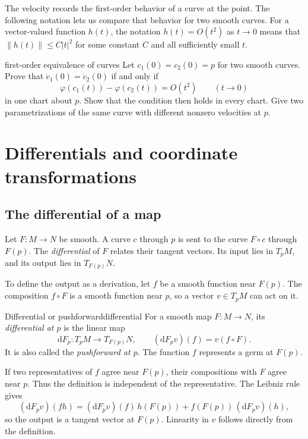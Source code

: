 \documentclass[11pt,a4paper]{article}
\numberwithin{equation}{section}
\newcommand{\dd}{\mathrm d}
\newcommand{\slidesref}[1]{\par\nobreak\smallskip\nobreak{\footnotesize\color{ink!60}\textsc{Source slides #1}}\par\nobreak\smallskip\nobreak}
\begin{document}
The velocity records the first-order behavior of a curve at the point.
The following notation lets us compare that behavior for two smooth curves.
For a vector-valued function \(h(t)\), the notation \(h(t)=O(t^2)\)
as \(t\to0\) means that \(\|h(t)\|\leq C|t|^2\) for some constant
\(C\) and all sufficiently small \(t\).

\begin{studentwork}[3.5cm]{first-order equivalence of curves}
Let \(c_1(0)=c_2(0)=p\) for two smooth curves. Prove that
\(\dot c_1(0)=\dot c_2(0)\) if and only if
\[
 \varphi(c_1(t))-\varphi(c_2(t))=O(t^2)
 \qquad (t\to0)
\]
in one chart about \(p\). Show that the condition then holds in every
chart. Give two parametrizations of the same curve with different
nonzero velocities at \(p\).
\end{studentwork}

\section{Differentials and coordinate transformations}
\label{sec:differentials}
\slidesref{9--10}

\subsection{The differential of a map}

Let \(F:M\to N\) be smooth. A curve \(c\) through \(p\) is sent to the
curve \(F\circ c\) through \(F(p)\). The \emph{differential} of \(F\)
relates their tangent vectors. Its input lies in \(T_pM\), and its output
lies in \(T_{F(p)}N\).

To define the output as a derivation, let \(f\) be a smooth function
near \(F(p)\). The composition \(f\circ F\) is a smooth function near
\(p\), so a vector \(v\in T_pM\) can act on it.

\begin{definition}{Differential or pushforward}{differential}
For a smooth map \(F:M\to N\), its \emph{differential at \(p\)} is the
linear map
\[
 \dd F_p:T_pM\longrightarrow T_{F(p)}N,
 \qquad (\dd F_p v)(f)=v(f\circ F).
\]
It is also called the \emph{pushforward at \(p\)}. The function \(f\)
represents a germ at \(F(p)\).
\end{definition}

If two representatives of \(f\) agree near \(F(p)\), their compositions
with \(F\) agree near \(p\). Thus the definition is independent of the
representative. The Leibniz rule gives
\[
 (\dd F_pv)(fh)
 =(\dd F_pv)(f)\,h(F(p))+f(F(p))\,(\dd F_pv)(h),
\]
so the output is a tangent vector at \(F(p)\). Linearity in \(v\)
follows directly from the definition.
\end{document}
